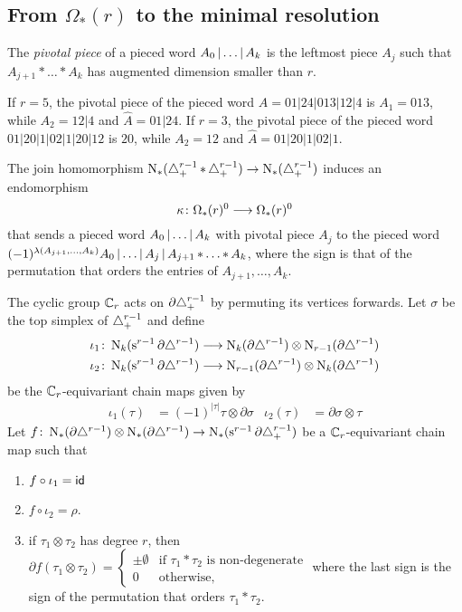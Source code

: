 
\subsection{From $\Omega_*(r)$ to the minimal resolution}\label{ss:mapf} The \emph{pivotal piece} of a pieced word $A_0\operatorname{|} \ldots\operatorname{|} A_k$ is the leftmost piece $A_j$ such that $A_{j+1}*\ldots*A_k$ has augmented dimension smaller than $r$.

\begin{example}
	If $r=5$, the pivotal piece of the pieced word $A=01|24|013|12|4$ is $A_1 = 013$, while $A_2 = 12|4$ and $\hat{A} = 01|24$. If $r=3$, the pivotal piece of the pieced word $01|20|1|02|1|20|12$ is $20$, while $A_2 = 12$ and $\hat{A} = 01|20|1|02|1$.
\end{example}

The join homomorphism $\operatorname{N}_*(\triangle_{+}^{r-1}\operatorname{\ast} \triangle_{+}^{r-1})\to \operatorname{N}_*(\triangle_{+}^{r-1})$ induces an endomorphism
\[
\kappa\colon \Omega_*(r)^0\longrightarrow \Omega_*(r)^0
\]
that sends a pieced word $A_0\operatorname{|} \ldots\operatorname{|} A_k$ with pivotal piece $A_j$ to the pieced word $(-1)^{\lambda(A_{j+1},\ldots,A_k)}A_0\operatorname{|} \ldots\operatorname{|} A_j\operatorname{|} A_{j+1}\operatorname{\ast}\ldots\operatorname{\ast} A_k$, where the sign is that of the permutation that orders the entries of $A_{j+1},\ldots,A_k$.

The cyclic group $\mathbb{C}_r$ acts on $\partial \triangle_{+}^{r-1}$ by permuting its vertices forwards. Let $\sigma$ be the top simplex of $\triangle_{+}^{r-1}$ and define
\begin{align*}
	\iota_1\colon \operatorname{N}_k(\operatorname{s}^{r-1}\partial \triangle^{r-1})&\longrightarrow \operatorname{N}_{k}(\partial\triangle^{r-1})\otimes \operatorname{N}_{r-1}(\partial\triangle^{r-1})\\
	\iota_2\colon \operatorname{N}_k(\operatorname{s}^{r-1}\partial \triangle^{r-1})&\longrightarrow \operatorname{N}_{r-1}(\partial\triangle^{r-1})\otimes \operatorname{N}_{k}(\partial\triangle^{r-1})
\end{align*}
be the $\mathbb{C}_r$-equivariant chain maps given by
\begin{align*}
	\iota_1(\tau) &= (-1)^{|\tau|}\tau\otimes \partial \sigma &
	\iota_2(\tau) &= \partial \sigma\otimes \tau
\end{align*}
Let $f\colon \operatorname{N}_*(\partial\triangle^{r-1})\otimes\operatorname{N}_*(\partial\triangle^{r-1})\to \operatorname{N}_*(\operatorname{s}^{r-1}\partial\triangle_{+}^{r-1})$ be a $\mathbb{C}_r$-equivariant chain map such that
\renewcommand{\theenumi}{\roman{enumi}}
\begin{enumerate}
	\item\label{cond:1} $f\circ \iota_1 = \mathsf{id}$
	\item\label{cond:2} $f\circ \iota_2 = \rho$.
	\item\label{cond:3} if $\tau_1\otimes\tau_2$ has degree $r$, then $ \partial f(\tau_1\otimes\tau_2) =
	\begin{cases}
		\pm\emptyset & \text{if $\tau_1* \tau_2$ is non-degenerate} \\
		0 & \text{otherwise},
	\end{cases}$
	where the last sign is the sign of the permutation that orders $\tau_1*\tau_2$.
\end{enumerate}

